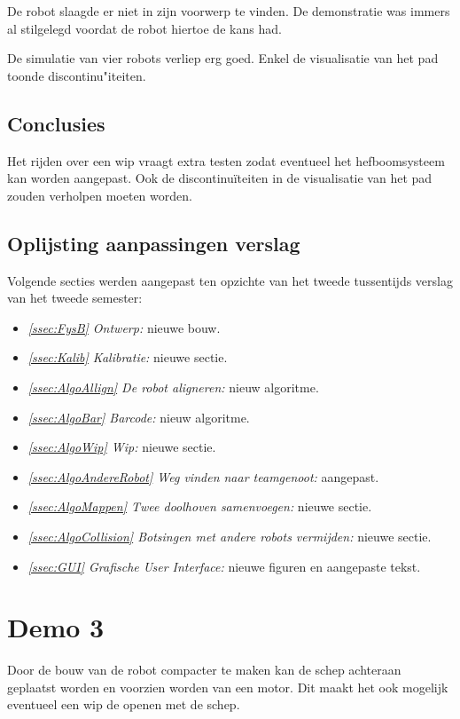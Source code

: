 \documentclass[eind]{penoverslag}
\begin{document}
{De robot slaagde er niet in zijn voorwerp te vinden. De demonstratie was immers al stilgelegd voordat de robot hiertoe de kans had.

De simulatie van vier robots verliep erg goed. Enkel de visualisatie van het pad toonde discontinu"iteiten.

\subsection{Conclusies}
\label{Assec:conc2}
Het rijden over een wip vraagt extra testen zodat eventueel het hefboomsysteem kan worden aangepast. Ook de discontinu\"iteiten in de visualisatie van het pad zouden verholpen moeten worden.

\subsection{Oplijsting aanpassingen verslag}
\label{Assec:aanp2}
Volgende secties werden aangepast ten opzichte van het tweede tussentijds verslag van het tweede semester:

\begin{itemize}
\item \textit{\ref{ssec:FysB} Ontwerp:} nieuwe bouw.
\item \textit{\ref{ssec:Kalib} Kalibratie:} nieuwe sectie.
\item \textit{\ref{ssec:AlgoAllign} De robot aligneren:} nieuw algoritme.
\item \textit{\ref{ssec:AlgoBar} Barcode:} nieuw algoritme.
\item \textit{\ref{ssec:AlgoWip} Wip:} nieuwe sectie.
\item \textit{\ref{ssec:AlgoAndereRobot} Weg vinden naar teamgenoot:} aangepast.
\item \textit{\ref{ssec:AlgoMappen} Twee doolhoven samenvoegen:} nieuwe sectie.
\item \textit{\ref{ssec:AlgoCollision} Botsingen met andere robots vermijden:} nieuwe sectie.
\item \textit{\ref{ssec:GUI} Grafische User Interface:} nieuwe figuren en aangepaste tekst.
\end{itemize}

\section{Demo 3}
\label{Asec:demo3}
Door de bouw van de robot compacter te maken kan de schep achteraan geplaatst worden en voorzien worden van een motor. Dit maakt het ook mogelijk eventueel een wip de openen met de schep.

}
\end{document}

